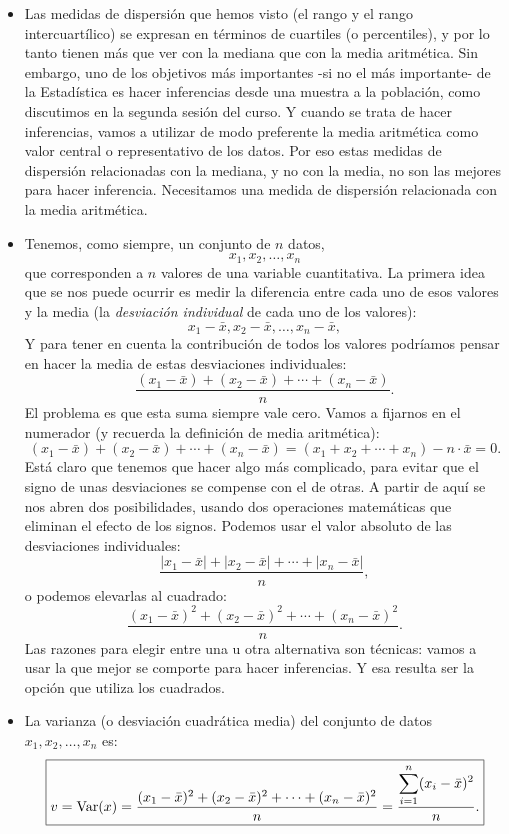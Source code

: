 \begin{itemize}

    \item Las medidas de dispersión que hemos visto (el rango y el rango intercuartílico) se expresan en términos de cuartiles (o percentiles), y  por lo tanto tienen más que ver con la mediana que con la media aritmética. Sin embargo, uno de los objetivos más importantes -si no el más importante- de la Estadística es hacer inferencias desde una muestra a la población, como discutimos en la segunda sesión del curso. Y cuando se trata de hacer inferencias, vamos a utilizar de modo preferente la media aritmética como valor central o representativo de los datos. Por eso estas medidas de dispersión relacionadas con la mediana, y no con la media, no son las mejores para hacer inferencia. {\sf Necesitamos una medida de dispersión relacionada con la media aritmética.}

    \item Tenemos, como siempre, un conjunto de $n$ datos,
        \[x_1,x_2,\ldots,x_n\]
        que corresponden a $n$ valores de una {\sf variable cuantitativa.}
        La primera idea que se nos puede ocurrir es medir la diferencia entre cada uno de esos valores y la media (la {\em desviación individual} de cada uno de los valores):
        \[x_1-\bar x, x_2-\bar x,\ldots, x_n-\bar x,\]
        Y para tener en cuenta la contribución de todos los valores podríamos pensar en hacer la media de estas desviaciones individuales:
        \[\dfrac{(x_1-\bar x)+(x_2-\bar x)+\cdots+(x_n-\bar x)}{n}.\]
        El problema es que esta suma siempre vale cero. Vamos a fijarnos en el numerador (y recuerda la definición de media aritmética):
        \[(x_1-\bar x)+(x_2-\bar x)+\cdots+(x_n-\bar x)=(x_1+x_2+\cdots+x_n)-n\cdot\bar x=0.\]
        Está claro que tenemos que hacer algo más complicado, para evitar que el signo de unas desviaciones se compense con el de otras. A partir de aquí se nos abren dos posibilidades, usando dos operaciones matemáticas que eliminan el efecto de los signos. Podemos usar el valor absoluto de las desviaciones individuales:
        \[\dfrac{|x_1-\bar x|+|x_2-\bar x|+\cdots+|x_n-\bar x|}{n},\]
        o podemos elevarlas al cuadrado:
        \[\dfrac{(x_1-\bar x)^2+(x_2-\bar x)^2+\cdots+(x_n-\bar x)^2}{n}.\]
        Las razones para elegir entre una u otra alternativa son técnicas: vamos a usar la que mejor se comporte para hacer inferencias. Y esa resulta ser la opción que utiliza los cuadrados.

    \item La {\sf varianza (o desviación cuadrática media)} del conjunto de datos $x_1,x_2,\ldots,x_n$ es:
        \begin{equation}
        \fbox{$v=\mbox{Var($x$)}=\dfrac{(x_1-\bar x)^2+(x_2-\bar x)^2+\cdots+(x_n-\bar x)^2}{n}=\dfrac{\displaystyle\sum_{i=1}^n(x_i-\bar x)^2}{n}.$}
        \end{equation}


\end{itemize}
